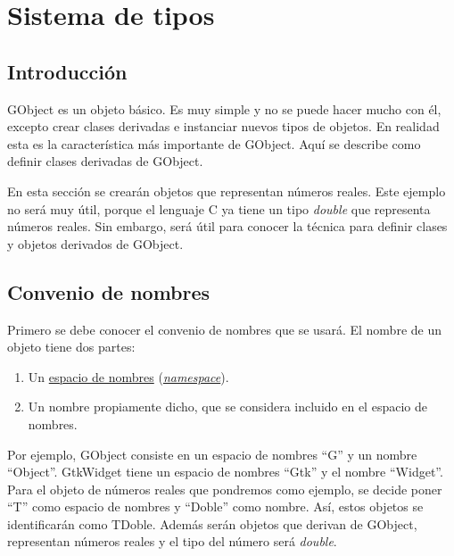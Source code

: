 %

\section{Sistema de tipos}
\subsection{Introducción}
\textsf{GObject} es un objeto básico. Es muy simple y no se puede hacer mucho con él, excepto crear
clases derivadas e instanciar nuevos tipos de objetos.
En realidad esta es la característica más importante de \textsf{GObject}.
Aquí se describe como definir clases derivadas de \textsf{GObject}.

En esta sección se crearán objetos que representan números reales. Este ejemplo no será muy útil, porque
el lenguaje C ya tiene un tipo \emph{double} que representa números reales. Sin embargo, será útil para
conocer la técnica para definir clases y objetos derivados de \textsf{GObject}.

\subsection{Convenio de nombres}
Primero se debe conocer el convenio de nombres que se usará. El nombre de un objeto tiene dos partes:
\begin{enumerate}
  \tightlist
\item Un \href{https://es.wikipedia.org/wiki/Espacio_de_nombres}{espacio de nombres}
  (\href{https://en.wikipedia.org/wiki/Namespace}{\textit{namespace}}).
\item Un nombre propiamente dicho, que se considera incluido en el espacio de nombres.
\end{enumerate}

Por ejemplo, \textsf{GObject} consiste en un espacio de nombres ``\textsf{G}'' y un nombre ``\textsf{Object}''.
\textsf{GtkWidget} tiene un espacio de nombres ``\textsf{Gtk}'' y el nombre ``\textsf{Widget}''.
Para el objeto de números reales que pondremos como ejemplo, se decide poner ``\textsf{T}'' como espacio
de nombres y ``\textsf{Doble}'' como nombre. Así, estos objetos se identificarán como \textsf{TDoble}.
Además serán objetos que derivan de \textsf{GObject}, representan números reales y el tipo del número
será \textit{double}.

